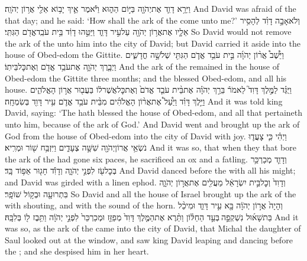 {וַיִּרָ֥א דָוִ֛ד אֶת\maqqaf יְהֹוָ֖ה בַּיּ֣וֹם הַה֑וּא וַיֹּ֕אמֶר אֵ֛יךְ יָב֥וֹא אֵלַ֖י אֲר֥וֹן יְהֹוָֽה׃}
{And David was afraid of the \lord\space that day; and he said: ‘How shall the ark of the \lord\space come unto me?’}
{וְלֹא\maqqaf אָבָ֣ה דָוִ֗ד לְהָסִ֥יר אֵלָ֛יו אֶת\maqqaf אֲר֥וֹן יְהֹוָ֖ה עַל\maqqaf עִ֣יר דָּוִ֑ד וַיַּטֵּ֣הוּ דָוִ֔ד בֵּ֥ית עֹבֵֽד\maqqaf אֱדֹ֖ם הַגִּתִּֽי׃}
{So David would not remove the ark of the \lord\space unto him into the city of David; but David carried it aside into the house of Obed-edom the Gittite.}
{וַיֵּ֩שֶׁב֩ אֲר֨וֹן יְהֹוָ֜ה בֵּ֣ית עֹבֵ֥ד אֱדֹ֛ם הַגִּתִּ֖י שְׁלֹשָׁ֣ה חֳדָשִׁ֑ים וַיְבָ֧רֶךְ יְהֹוָ֛ה אֶת\maqqaf עֹבֵ֥ד אֱדֹ֖ם וְאֶת\maqqaf כׇּל\maqqaf בֵּיתֽוֹ׃}
{And the ark of the \lord\space remained in the house of Obed-edom the Gittite three months; and the \lord\space blessed Obed-edom, and all his house.}
{וַיֻּגַּ֗ד לַמֶּ֣לֶךְ דָּוִד֮ לֵאמֹר֒ בֵּרַ֣ךְ יְהֹוָ֗ה אֶת\maqqaf בֵּ֨ית עֹבֵ֤ד אֱדֹם֙ וְאֶת\maqqaf כׇּל\maqqaf אֲשֶׁר\maqqaf ל֔וֹ בַּעֲב֖וּר אֲר֣וֹן הָאֱלֹהִ֑ים וַיֵּ֣לֶךְ דָּוִ֗ד וַיַּ֩עַל֩ אֶת\maqqaf אֲר֨וֹן הָאֱלֹהִ֜ים מִבֵּ֨ית עֹבֵ֥ד אֱדֹ֛ם עִ֥יר דָּוִ֖ד בְּשִׂמְחָֽה׃}
{And it was told king David, saying: ‘The \lord\space hath blessed the house of Obed-edom, and all that pertaineth unto him, because of the ark of God.’ And David went and brought up the ark of God from the house of Obed-edom into the city of David with joy.}
{וַיְהִ֗י כִּ֧י צָעֲד֛וּ נֹשְׂאֵ֥י אֲרוֹן\maqqaf יְהֹוָ֖ה שִׁשָּׁ֣ה צְעָדִ֑ים וַיִּזְבַּ֥ח שׁ֖וֹר וּמְרִֽיא׃}
{And it was so, that when they that bore the ark of the \lord\space had gone six paces, he sacrificed an ox and a fatling.}
{וְדָוִ֛ד מְכַרְכֵּ֥ר בְּכׇל\maqqaf עֹ֖ז לִפְנֵ֣י יְהֹוָ֑ה וְדָוִ֕ד חָג֖וּר אֵפ֥וֹד בָּֽד׃}
{And David danced before the \lord\space with all his might; and David was girded with a linen ephod.}
{וְדָוִד֙ וְכׇל\maqqaf בֵּ֣ית יִשְׂרָאֵ֔ל מַעֲלִ֖ים אֶת\maqqaf אֲר֣וֹן יְהֹוָ֑ה בִּתְרוּעָ֖ה וּבְק֥וֹל שׁוֹפָֽר׃}
{So David and all the house of Israel brought up the ark of the \lord\space with shouting, and with the sound of the horn.}
{וְהָיָה֙ אֲר֣וֹן יְהֹוָ֔ה בָּ֖א עִ֣יר דָּוִ֑ד וּמִיכַ֨ל בַּת\maqqaf שָׁא֜וּל נִשְׁקְפָ֣ה \legarmeh  בְּעַ֣ד הַחַלּ֗וֹן וַתֵּ֨רֶא אֶת\maqqaf הַמֶּ֤לֶךְ דָּוִד֙ מְפַזֵּ֤ז וּמְכַרְכֵּר֙ לִפְנֵ֣י יְהֹוָ֔ה וַתִּ֥בֶז ל֖וֹ בְּלִבָּֽהּ׃}
{And it was so, as the ark of the \lord\space came into the city of David, that Michal the daughter of Saul looked out at the window, and saw king David leaping and dancing before the \lord; and she despised him in her heart.}
